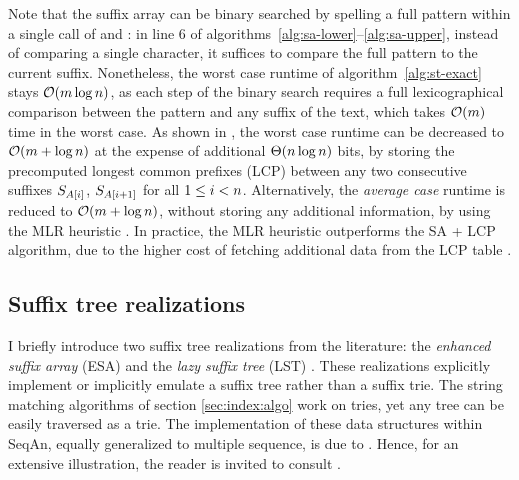 Note that the suffix array can be binary searched by spelling a full pattern within a single call of  and : in line 6 of algorithms~\ref{alg:sa-lower}--\ref{alg:sa-upper}, instead of comparing a single character, it suffices to compare the full pattern to the current suffix.
Nonetheless, the worst case runtime of algorithm~\ref{alg:st-exact} stays $\mathcal{O}(m \log{n})$, as each step of the binary search requires a full lexicographical comparison between the pattern and any suffix of the text, which takes $\mathcal{O}(m)$ time in the worst case.
As shown in \citep{Manber1990}, the worst case runtime can be decreased to $\mathcal{O}(m + \log{n})$ at the expense of additional $\Theta(n \log{n})$ bits, by storing the precomputed longest common prefixes (LCP) between any two consecutive suffixes ${S}_{A\left[i\right]}$, ${S}_{A\left[i+1\right]}$ for all $1 \leq i < n$.
Alternatively, the \emph{average case} runtime is reduced to $\mathcal{O}(m + \log{n})$, without storing any additional information, by using the MLR heuristic \citep{Manber1990}.
In practice, the MLR heuristic outperforms the SA + LCP algorithm, due to the higher cost of fetching additional data from the LCP table \citep{Weese2013}.


\subsection{Suffix tree realizations}
\label{sec:index:stree}

I briefly introduce two suffix tree realizations from the literature: the \emph{enhanced suffix array} (ESA) \citep{Abouelhoda2004} and the \emph{lazy suffix tree} (LST) \citep{Giegerich2003}.
These realizations explicitly implement or implicitly emulate a suffix tree rather than a suffix trie.
The string matching algorithms of section \ref{sec:index:algo} work on tries, yet any tree can be easily traversed as a trie.
The implementation of these data structures within SeqAn, equally generalized to multiple sequence, is due to \citeauthor{Weese2013}.
Hence, for an extensive illustration, the reader is invited to consult \citep{Weese2013}.

